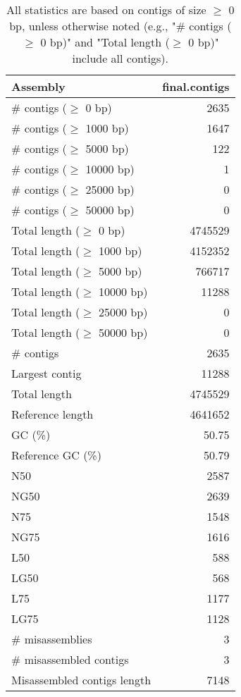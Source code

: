 \documentclass[12pt,a4paper]{article}
\begin{document}
\begin{table}[ht]
\begin{center}
\caption{All statistics are based on contigs of size $\geq$ 0 bp, unless otherwise noted (e.g., "\# contigs ($\geq$ 0 bp)" and "Total length ($\geq$ 0 bp)" include all contigs).}
\begin{tabular}{|l*{1}{|r}|}
\hline
Assembly & final.contigs \\ \hline
\# contigs ($\geq$ 0 bp) & 2635 \\ \hline
\# contigs ($\geq$ 1000 bp) & 1647 \\ \hline
\# contigs ($\geq$ 5000 bp) & 122 \\ \hline
\# contigs ($\geq$ 10000 bp) & 1 \\ \hline
\# contigs ($\geq$ 25000 bp) & 0 \\ \hline
\# contigs ($\geq$ 50000 bp) & 0 \\ \hline
Total length ($\geq$ 0 bp) & 4745529 \\ \hline
Total length ($\geq$ 1000 bp) & 4152352 \\ \hline
Total length ($\geq$ 5000 bp) & 766717 \\ \hline
Total length ($\geq$ 10000 bp) & 11288 \\ \hline
Total length ($\geq$ 25000 bp) & 0 \\ \hline
Total length ($\geq$ 50000 bp) & 0 \\ \hline
\# contigs & 2635 \\ \hline
Largest contig & 11288 \\ \hline
Total length & 4745529 \\ \hline
Reference length & 4641652 \\ \hline
GC (\%) & 50.75 \\ \hline
Reference GC (\%) & 50.79 \\ \hline
N50 & 2587 \\ \hline
NG50 & 2639 \\ \hline
N75 & 1548 \\ \hline
NG75 & 1616 \\ \hline
L50 & 588 \\ \hline
LG50 & 568 \\ \hline
L75 & 1177 \\ \hline
LG75 & 1128 \\ \hline
\# misassemblies & 3 \\ \hline
\# misassembled contigs & 3 \\ \hline
Misassembled contigs length & 7148 \\ \hline

\end{tabular}
\end{center}
\end{table}
\end{document}
